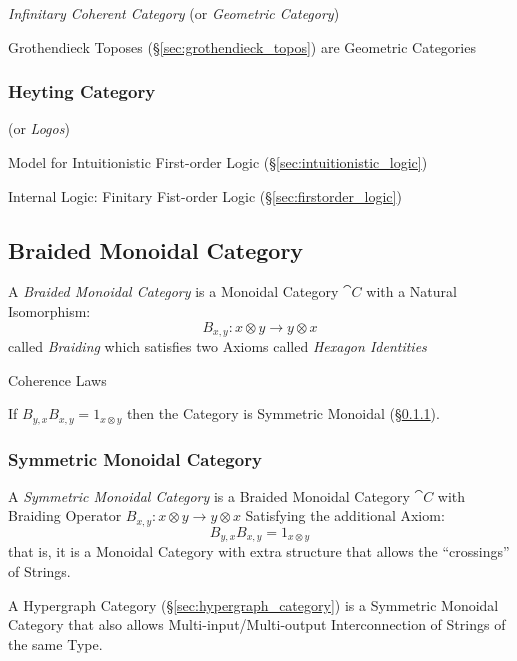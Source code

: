 \emph{Infinitary Coherent Category} (or \emph{Geometric Category})

Grothendieck Toposes (\S\ref{sec:grothendieck_topos}) are Geometric
Categories



\subsubsection{Heyting Category}\label{sec:heyting_category}

(or \emph{Logos})

Model for Intuitionistic First-order Logic
(\S\ref{sec:intuitionistic_logic})

Internal Logic: Finitary Fist-order Logic
(\S\ref{sec:firstorder_logic})



\subsection{Braided Monoidal Category}\label{sec:braided_monoidal}

A \emph{Braided Monoidal Category} is a Monoidal Category $\cat{C}$
with a Natural Isomorphism:
\[
  B_{x,y} : x \otimes y \rightarrow y \otimes x
\]
called \emph{Braiding} which satisfies two Axioms called \emph{Hexagon
  Identities} %

Coherence Laws

If $B_{y,x} B_{x,y} = 1_{x \otimes y}$ then the Category is Symmetric
Monoidal (\S\ref{sec:symmetric_monoidal}).



\subsubsection{Symmetric Monoidal Category}\label{sec:symmetric_monoidal}

A \emph{Symmetric Monoidal Category} is a Braided Monoidal Category
$\cat{C}$ with Braiding Operator $B_{x,y} : x \otimes y \rightarrow y
\otimes x$ Satisfying the additional Axiom:
\[
  B_{y,x} B_{x,y} = 1_{x \otimes y}
\]
that is, it is a Monoidal Category with extra structure that allows
the ``crossings'' of Strings.

A Hypergraph Category (\S\ref{sec:hypergraph_category}) is a Symmetric
Monoidal Category that also allows Multi-input/Multi-output
Interconnection of Strings of the same Type.


